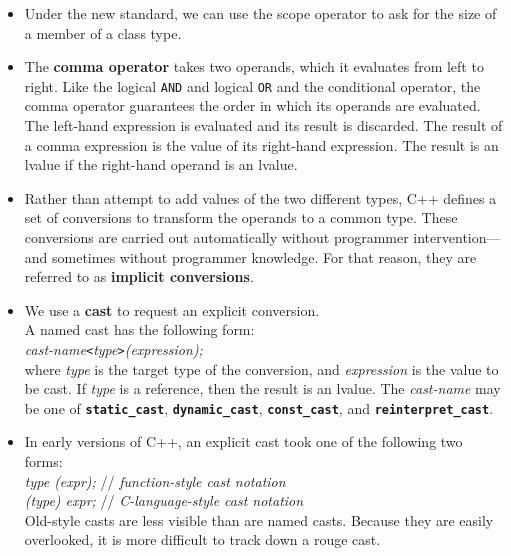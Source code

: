 \begin{itemize}
\item
Under the new standard, we can use the scope operator to ask for the size of a member of a class type.

\item
The \textbf{comma operator} takes two operands, which it evaluates from left to right. Like the logical \texttt{AND} and logical \texttt{OR} and the conditional operator, the comma operator guarantees the order in which its operands are evaluated.\\
The left-hand expression is evaluated and its result is discarded. The result of a comma expression is the value of its right-hand expression. The result is an lvalue if the right-hand operand is an lvalue.

\item
Rather than attempt to add values of the two different types, C++ defines a set of conversions to transform the operands to a common type. These conversions are carried out automatically without programmer intervention---and sometimes without programmer knowledge. For that reason, they are referred to as \textbf{implicit conversions}.

\item
We use a \textbf{cast} to request an explicit conversion.\\
A named cast has the following form:\\
\hspace*{1em}\textit{cast-name}\texttt{<}\textit{type}\texttt{>}\textit{(expression);}\\
where \textit{type} is the target type of the conversion, and \textit{expression} is the value to be cast. If \textit{type} is a reference, then the result is an lvalue. The \textit{cast-name} may be one of \texttt{\textbf{static\_cast}}, \texttt{\textbf{dynamic\_cast}}, \texttt{\textbf{const\_cast}}, and \texttt{\textbf{reinterpret\_cast}}.

\item
In early versions of C++, an explicit cast took one of the following two forms:\\
\hspace*{1em}\textit{type (expr);} // \textit{function-style cast notation}\\
\hspace*{1em}\textit{(type) expr;} // \textit{C-language-style cast notation}\\
Old-style casts are less visible than are named casts. Because they are easily overlooked, it is more difficult to track down a rouge cast.

\end{itemize}